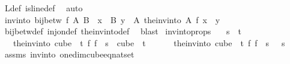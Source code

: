 \begin{isabellebody}
\ L{\isacharunderscore}{\kern0pt}def\ is{\isacharunderscore}{\kern0pt}line{\isacharunderscore}{\kern0pt}def\ \isamarkupfalse%
\ auto\isanewline
{}\isamarkupfalse%
%
\endisatagproof
{\isafoldproof}%
%
\isadelimproof
\isanewline
%
\endisadelimproof
\isanewline
{}\isamarkupfalse%
\ invinto{\isacharcolon}{\kern0pt}\ {\isachardoublequoteopen}bij{\isacharunderscore}{\kern0pt}betw\ f\ A\ B\ {\isasymLongrightarrow}\ {\isacharparenleft}{\kern0pt}{\isasymforall}x\ {\isasymin}\ B{\isachardot}{\kern0pt}\ {\isasymexists}{\isacharbang}{\kern0pt}y\ {\isasymin}\ A{\isachardot}{\kern0pt}\ {\isacharparenleft}{\kern0pt}the{\isacharunderscore}{\kern0pt}inv{\isacharunderscore}{\kern0pt}into\ A\ f{\isacharparenright}{\kern0pt}\ x\ {\isacharequal}{\kern0pt}\ y{\isacharparenright}{\kern0pt}{\isachardoublequoteclose}\ \isanewline
%
\isadelimproof
\ \ %
\endisadelimproof
%
\isatagproof
{}\isamarkupfalse%
\ bij{\isacharunderscore}{\kern0pt}betw{\isacharunderscore}{\kern0pt}def\ inj{\isacharunderscore}{\kern0pt}on{\isacharunderscore}{\kern0pt}def\ the{\isacharunderscore}{\kern0pt}inv{\isacharunderscore}{\kern0pt}into{\isacharunderscore}{\kern0pt}def\ \isamarkupfalse%
\ blast%
\endisatagproof
{\isafoldproof}%
%
\isadelimproof
\isanewline
%
\endisadelimproof
\isanewline
{}\isamarkupfalse%
\ invintoprops{\isacharcolon}{\kern0pt}\isanewline
\ \ \ {\isachardoublequoteopen}s\ {\isacharless}{\kern0pt}\ t{\isachardoublequoteclose}\isanewline
\ \ \ {\isachardoublequoteopen}the{\isacharunderscore}{\kern0pt}inv{\isacharunderscore}{\kern0pt}into\ {\isacharparenleft}{\kern0pt}cube\ {}\ t{\isacharparenright}{\kern0pt}\ {\isacharparenleft}{\kern0pt}{\isasymlambda}f{\isachardot}{\kern0pt}\ f\ {}{\isacharparenright}{\kern0pt}\ s\ {\isasymin}\ cube\ {}\ t{\isachardoublequoteclose}\ \isanewline
\ \ \ \ \ {\isachardoublequoteopen}the{\isacharunderscore}{\kern0pt}inv{\isacharunderscore}{\kern0pt}into\ {\isacharparenleft}{\kern0pt}cube\ {}\ t{\isacharparenright}{\kern0pt}\ {\isacharparenleft}{\kern0pt}{\isasymlambda}f{\isachardot}{\kern0pt}\ f\ {}{\isacharparenright}{\kern0pt}\ s\ {}\ {\isacharequal}{\kern0pt}\ s{\isachardoublequoteclose}\isanewline
%
\isadelimproof
\ \ %
\endisadelimproof
%
\isatagproof
{}\isamarkupfalse%
\ assms\ invinto\ one{\isacharunderscore}{\kern0pt}dim{\isacharunderscore}{\kern0pt}cube{\isacharunderscore}{\kern0pt}eq{\isacharunderscore}{\kern0pt}nat{\isacharunderscore}{\kern0pt}set\ \isamarkupfalse%

\end{isabellebody}
